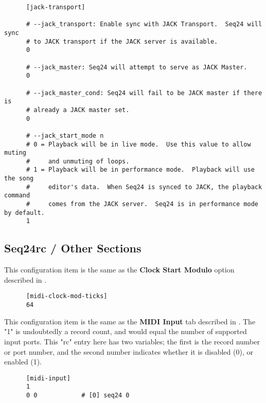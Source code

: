    \begin{verbatim}
      [jack-transport]

      # --jack_transport: Enable sync with JACK Transport.  Seq24 will sync
      # to JACK transport if the JACK server is available.
      0

      # --jack_master: Seq24 will attempt to serve as JACK Master.
      0

      # --jack_master_cond: Seq24 will fail to be JACK master if there is
      # already a JACK master set.
      0

      # --jack_start_mode n
      # 0 = Playback will be in live mode.  Use this value to allow muting
      #     and unmuting of loops.
      # 1 = Playback will be in performance mode.  Playback will use the song
      #     editor's data.  When Seq24 is synced to JACK, the playback command
      #     comes from the JACK server.  Seq24 is in performance mode by default.
      1
   \end{verbatim}

\subsection{Seq24rc / Other Sections}
\label{subsec:seq24_rc_file_other_midi}

   This configuration item is the same as the
   \textbf{Clock Start Modulo} option described in
   .

   \begin{verbatim}
      [midi-clock-mod-ticks]
      64
   \end{verbatim}

   This configuration item is the same as the 
   \textbf{MIDI Input} tab described in
   .
   The "1" is undoubtedly a record count, and would equal the number of
   supported input ports.
   This "rc" entry here has two variables; the first is the record number or
   port number, and the second number indicates whether it is disabled (0),
   or enabled (1).

   \begin{verbatim}
      [midi-input]
      1
      0 0            # [0] seq24 0
   \end{verbatim}

